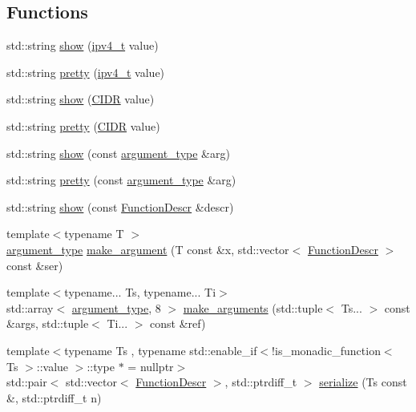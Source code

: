 \subsection*{Functions}
\begin{DoxyCompactItemize}
\item 
std\+::string \hyperlink{namespacepfq_1_1lang_a6b371b706602987f7e45c7558824fa34}{show} (\hyperlink{structpfq_1_1lang_1_1ipv4__t}{ipv4\+\_\+t} value)
\item 
std\+::string \hyperlink{namespacepfq_1_1lang_a7a4c9ec62feae5479366427beeff5b74}{pretty} (\hyperlink{structpfq_1_1lang_1_1ipv4__t}{ipv4\+\_\+t} value)
\item 
std\+::string \hyperlink{namespacepfq_1_1lang_aaa8805ef12da2a39822f13e96197cadd}{show} (\hyperlink{structpfq_1_1lang_1_1CIDR}{C\+I\+DR} value)
\item 
std\+::string \hyperlink{namespacepfq_1_1lang_a980343a34857c5e35e675e8281c0052f}{pretty} (\hyperlink{structpfq_1_1lang_1_1CIDR}{C\+I\+DR} value)
\item 
std\+::string \hyperlink{namespacepfq_1_1lang_a1e54c94175cad1980fc43030d265b58a}{show} (const \hyperlink{structpfq_1_1lang_1_1argument__type}{argument\+\_\+type} \&arg)
\item 
std\+::string \hyperlink{namespacepfq_1_1lang_a2dc4c3535607e668e86aa96674c41eb0}{pretty} (const \hyperlink{structpfq_1_1lang_1_1argument__type}{argument\+\_\+type} \&arg)
\item 
std\+::string \hyperlink{namespacepfq_1_1lang_a7e9458d3c3b90f405ee6df6cbfc43c58}{show} (const \hyperlink{structpfq_1_1lang_1_1FunctionDescr}{Function\+Descr} \&descr)
\item 
{\footnotesize template$<$typename T $>$ }\\\hyperlink{structpfq_1_1lang_1_1argument__type}{argument\+\_\+type} \hyperlink{namespacepfq_1_1lang_ac28f404ec59b7aea311721e0f26b5577}{make\+\_\+argument} (T const \&x, std\+::vector$<$ \hyperlink{structpfq_1_1lang_1_1FunctionDescr}{Function\+Descr} $>$ const \&ser)
\item 
{\footnotesize template$<$typename... Ts, typename... Ti$>$ }\\std\+::array$<$ \hyperlink{structpfq_1_1lang_1_1argument__type}{argument\+\_\+type}, 8 $>$ \hyperlink{namespacepfq_1_1lang_aacc9139aafd72e1f19af3a74c1fdc6dc}{make\+\_\+arguments} (std\+::tuple$<$ Ts... $>$ const \&args, std\+::tuple$<$ Ti... $>$ const \&ref)
\item 
{\footnotesize template$<$typename Ts , typename std\+::enable\+\_\+if$<$!is\+\_\+monadic\+\_\+function$<$ Ts $>$\+::value $>$\+::type $\ast$  = nullptr$>$ }\\std\+::pair$<$ std\+::vector$<$ \hyperlink{structpfq_1_1lang_1_1FunctionDescr}{Function\+Descr} $>$, std\+::ptrdiff\+\_\+t $>$ \hyperlink{namespacepfq_1_1lang_ae121f9fc8e23fbd6873d45d02e9adb81}{serialize} (Ts const \&, std\+::ptrdiff\+\_\+t n)

\end{DoxyCompactItemize}
